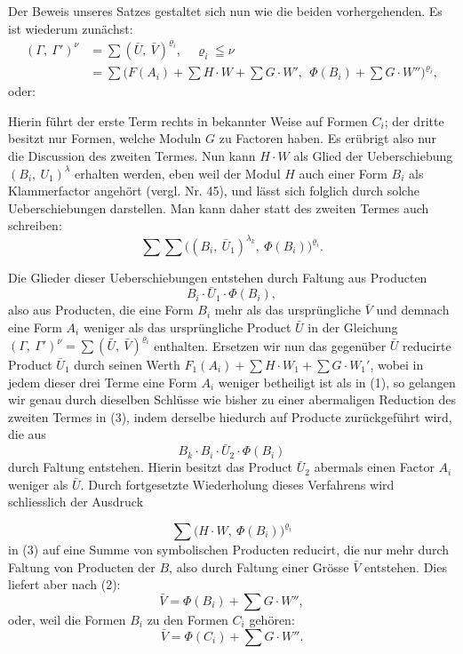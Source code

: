 Der Beweis unseres Satzes gestaltet sich nun wie die beiden
vorhergehenden. Es ist wiederum zunächst:
\[
\begin{aligned}
(\Gamma,\ \Gamma')^\nu &= \sum (\bar U,\ \bar V)^{\varrho_i}, \quad \varrho_i \leqq \nu\\
&= \sum \bigl(F(A_i) + \sum H\cdot W + \sum G\cdot W',\ \ \Phi(B_i) + \sum G\cdot W''\bigr)^{\varrho_i},
\end{aligned}
\]
oder:

Hierin führt der erste Term rechts in bekannter Weise auf Formen $C_i$;
der dritte besitzt nur Formen, welche Moduln $G$ zu Factoren haben. Es
erübrigt also nur die Discussion des zweiten Termes. Nun kann $H\cdot W$
als Glied der Ueberschiebung $(B_i,\ U_1)^\lambda$ erhalten werden, eben
weil der Modul $H$ auch einer Form $B_i$ als Klammerfactor angehört
(vergl. Nr. 45), und lässt sich folglich durch solche Ueberschiebungen
darstellen. Man kann daher statt des zweiten Termes auch schreiben:
\[ \sum \sum \bigl((B_i,\ \bar U_1)^{\lambda_k},\ \Phi(B_i)\bigr)^{\varrho_i}. \]

Die Glieder dieser Ueberschiebungen entstehen durch Faltung aus Producten
\[ B_i \cdot \bar U_1 \cdot \Phi(B_i), \]
also aus Producten, die eine Form $B_i$ mehr als das ursprüngliche $\bar
V$ und demnach eine Form $A_i$ weniger als das ursprüngliche Product
$\bar U$ in der Gleichung $(\Gamma,\ \Gamma')^\nu = \sum (\bar U,\ \bar
V)^{\varrho_i}$ enthalten. Ersetzen wir nun das gegenüber $\bar U$
reducirte Product $\bar U_1$ durch seinen Werth $F_1(A_i) + \sum H\cdot
W_1 + \sum G\cdot W_1'$, wobei in jedem dieser drei Terme eine Form $A_i$
weniger betheiligt ist als in (1), so gelangen wir genau durch dieselben
Schlüsse wie bisher zu einer abermaligen Reduction des zweiten Termes in
(3), indem derselbe hiedurch auf Producte zurückgeführt wird, die aus
\[ B_k \cdot B_i \cdot \bar U_2 \cdot \Phi(B_i) \]
durch Faltung entstehen. Hierin besitzt das Product $\bar U_2$ abermals
einen Factor $A_i$ weniger als $\bar U$. Durch fortgesetzte Wiederholung
dieses Verfahrens wird schliesslich der Ausdruck


\[ \sum \bigl(H\cdot W,\ \Phi(B_i)\bigr)^{\varrho_i} \]
in (3) auf eine Summe von symbolischen Producten reducirt, die nur mehr
durch Faltung von Producten der $B$, also durch Faltung einer Grösse
$\bar V$ entstehen. Dies liefert aber nach (2):
\[ \bar V = \Phi(B_i) + \sum G\cdot W'', \]
oder, weil die Formen $B_i$ zu den Formen $C_i$ gehören:
\[ \bar V = \Phi(C_i) + \sum G\cdot W''. \]

